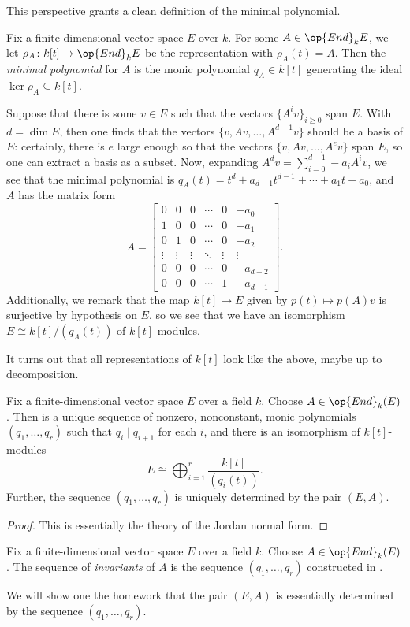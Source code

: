 \documentclass[../notes.tex]{subfiles}
\begin{document}
This perspective grants a clean definition of the minimal polynomial.
\begin{definition}
	Fix a finite-dimensional vector space $E$ over $k$. For some $A\in\op{End}_kE$, we let $\rho_A\colon k[t]\to\op{End}_kE$ be the representation with $\rho_A(t)=A$. Then the \textit{minimal polynomial} for $A$ is the monic polynomial $q_A\in k[t]$ generating the ideal $\ker\rho_A\subseteq k[t]$.
\end{definition}
\begin{example}
	Suppose that there is some $v\in E$ such that the vectors $\{A^iv\}_{i\ge0}$ span $E$. With $d=\dim E$, then one finds that the vectors $\{v,Av,\ldots,A^{d-1}v\}$ should be a basis of $E$: certainly, there is $e$ large enough so that the vectors $\{v,Av,\ldots,A^ev\}$ span $E$, so one can extract a basis as a subset. Now, expanding $A^dv=\sum_{i=0}^{d-1}-a_iA^iv$, we see that the minimal polynomial is $q_A(t)=t^d+a_{d-1}t^{d-1}+\cdots+a_1t+a_0$, and $A$ has the matrix form
	\[A=\begin{bmatrix}
		0 & 0 & 0 & \cdots & 0 & -a_0 \\
		1 & 0 & 0 & \cdots & 0 & -a_1 \\
		0 & 1 & 0 & \cdots & 0 & -a_2 \\
		\vdots & \vdots & \vdots & \ddots & \vdots & \vdots \\
		0 & 0 & 0 & \cdots & 0 & -a_{d-2} \\
		0 & 0 & 0 & \cdots & 1 & -a_{d-1}
	\end{bmatrix}.\]
	Additionally, we remark that the map $k[t]\to E$ given by $p(t)\mapsto p(A)v$ is surjective by hypothesis on $E$, so we see that we have an isomorphism $E\cong k[t]/(q_A(t))$ of $k[t]$-modules.
\end{example}
It turns out that all representations of $k[t]$ look like the above, maybe up to decomposition.
\begin{theorem} \label{thm:jordan-normal}
	Fix a finite-dimensional vector space $E$ over a field $k$. Choose $A\in\op{End}_k(E)$. Then is a unique sequence of nonzero, nonconstant, monic polynomials $(q_1,\ldots,q_r)$ such that $q_i\mid q_{i+1}$ for each $i$, and there is an isomorphism of $k[t]$-modules
	\[E\cong\bigoplus_{i=1}^r\frac{k[t]}{(q_i(t))}.\]
	Further, the sequence $(q_1,\ldots,q_r)$ is uniquely determined by the pair $(E,A)$.
\end{theorem}
\begin{proof}
	This is essentially the theory of the Jordan normal form.
\end{proof}
\begin{definition}[invariants]
	Fix a finite-dimensional vector space $E$ over a field $k$. Choose $A\in\op{End}_k(E)$. The sequence of \textit{invariants} of $A$ is the sequence $(q_1,\ldots,q_r)$ constructed in .
\end{definition}
We will show one the homework that the pair $(E,A)$ is essentially determined by the sequence $(q_1,\ldots,q_r)$.
\end{document}
